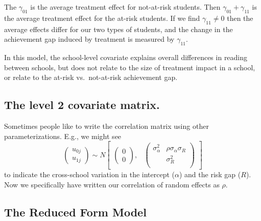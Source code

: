 \documentclass[
  letterpaper,
  DIV=11,
  numbers=noendperiod]{scrreprt}
\begin{document}
The \(\gamma_{01}\) is the average treatment effect for not-at-risk
students. Then \(\gamma_{01} + \gamma_{11}\) is the average treatment
effect for the at-risk students. If we find \(\gamma_{11} \neq 0\) then
the average effects differ for our two types of students, and the change
in the achievement gap induced by treatment is measured by
\(\gamma_{11}\).

In this model, the school-level covariate explains overall differences
in reading between schools, but does not relate to the size of treatment
impact in a school, or relate to the at-risk vs.~not-at-risk achievement
gap.

\subsection{The level 2 covariate
matrix.}\label{the-level-2-covariate-matrix.}

Sometimes people like to write the correlation matrix using other
parameterizations. E.g., we might see \[
\begin{pmatrix} u_{0j} \\
u_{1j}
\end{pmatrix} \sim  N
\begin{bmatrix}
\begin{pmatrix}
0 \\
0
\end{pmatrix}\!\!,&
\begin{pmatrix}
\sigma^2_\alpha & \rho \sigma_\alpha \sigma_R \\
 & \sigma^2_R \\
\end{pmatrix}
\end{bmatrix}
\] to indicate the cross-school variation in the intercept (\(\alpha\))
and the risk gap (\(R\)). Now we specifically have written our
correlation of random effects as \(\rho\).

\subsection{The Reduced Form Model}\label{the-reduced-form-model-1}
\end{document}
